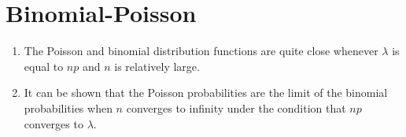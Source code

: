 \section{Binomial-Poisson}

\begin{enumerate}
    \item The Poisson and binomial distribution functions are quite close whenever $\lambda$ is equal to $np$ and $n$ is relatively large.
    \hfill \cite{statistics/book/Statistics-for-Data-Scientists/Maurits-Kaptein}

    \item It can be shown that the Poisson probabilities are the limit of the binomial probabilities when $n$ converges to infinity under the condition that $np$ converges to $\lambda$.
    \hfill \cite{statistics/book/Statistics-for-Data-Scientists/Maurits-Kaptein}
\end{enumerate}

